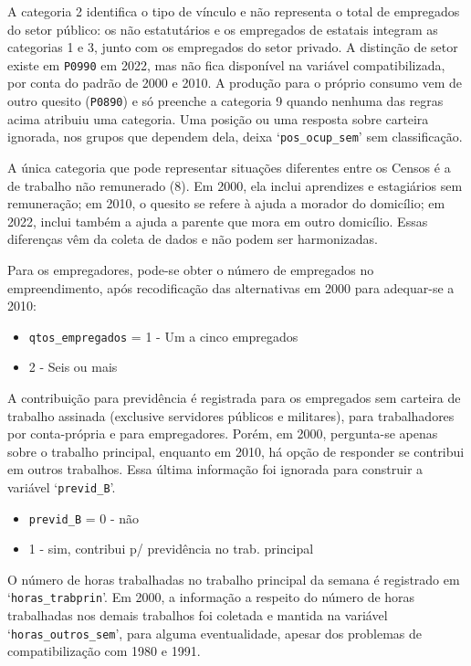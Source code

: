 \documentclass[12pt,a4paper]{article}
\newcommand{\vr}[1]{\texttt{#1}}
\begin{document}
A categoria 2 identifica o tipo de vínculo e não representa o total de empregados do setor público: os não estatutários e os empregados de estatais integram as categorias 1 e 3, junto com os empregados do setor privado. A distinção de setor existe em \vr{P0990} em 2022, mas não fica disponível na variável compatibilizada, por conta do padrão de 2000 e 2010. A produção para o próprio consumo vem de outro quesito (\vr{P0890}) e só preenche a categoria 9 quando nenhuma das regras acima atribuiu uma categoria. Uma posição ou uma resposta sobre carteira ignorada, nos grupos que dependem dela, deixa ‘\vr{pos\_ocup\_sem}’ sem classificação.

A única categoria que pode representar situações diferentes entre os Censos é a de trabalho não remunerado (8). Em 2000, ela inclui aprendizes e estagiários sem remuneração; em 2010, o quesito se refere à ajuda a morador do domicílio; em 2022, inclui também a ajuda a parente que mora em outro domicílio. Essas diferenças vêm da coleta de dados e não podem ser harmonizadas.

Para os empregadores, pode-se obter o número de empregados no empreendimento, após recodificação das alternativas em 2000 para adequar-se a 2010:
\begin{itemize}
  \item \vr{qtos\_empregados} = 1 - Um a cinco empregados
  \item 2 - Seis ou mais
\end{itemize}

A contribuição para previdência é registrada para os empregados sem carteira de trabalho assinada (exclusive servidores públicos e militares), para trabalhadores por conta-própria e para empregadores. Porém, em 2000, pergunta-se apenas sobre o trabalho principal, enquanto em 2010, há opção de responder se contribui em outros trabalhos. Essa última informação foi ignorada para construir a variável ‘\vr{previd\_B}’.
\begin{itemize}
  \item \vr{previd\_B} = 0 - não
  \item 1 - sim, contribui p/ previdência no trab. principal
\end{itemize}

O número de horas trabalhadas no trabalho principal da semana é registrado em ‘\vr{horas\_trabprin}’. Em 2000, a informação a respeito do número de horas trabalhadas nos demais trabalhos foi coletada e mantida na variável ‘\vr{horas\_outros\_sem}’, para alguma eventualidade, apesar dos problemas de compatibilização com 1980 e 1991.
\end{document}
